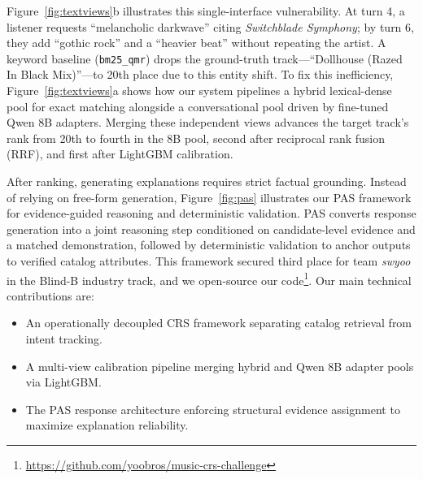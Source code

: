 Figure~\ref{fig:textviews}b illustrates this single-interface vulnerability. At turn 4, a listener requests ``melancholic darkwave'' citing \textit{Switchblade Symphony}; by turn 6, they add ``gothic rock'' and a ``heavier beat'' without repeating the artist. A keyword baseline (\texttt{bm25\_qmr}) drops the ground-truth track---``Dollhouse (Razed In Black Mix)''---to 20th place due to this entity shift. To fix this inefficiency, Figure~\ref{fig:textviews}a shows how our system pipelines a hybrid lexical-dense pool for exact matching alongside a conversational pool driven by fine-tuned Qwen 8B adapters. Merging these independent views advances the target track's rank from 20th to fourth in the 8B pool, second after reciprocal rank fusion (RRF), and first after LightGBM calibration.

After ranking, generating explanations requires strict factual grounding. Instead of relying on free-form generation, Figure~\ref{fig:pas} illustrates our PAS framework for evidence-guided reasoning and deterministic validation. PAS converts response generation into a joint reasoning step conditioned on candidate-level evidence and a matched demonstration, followed by deterministic validation to anchor outputs to verified catalog attributes. This framework secured third place for team \textit{swyoo} in the Blind-B industry track, and we open-source our code\footnote{\url{https://github.com/yoobros/music-crs-challenge}}. Our main technical contributions are:
\begin{itemize}
    \item An operationally decoupled CRS framework separating catalog retrieval from intent tracking.
    \item A multi-view calibration pipeline merging hybrid and Qwen 8B adapter pools via LightGBM.
    \item The PAS response architecture enforcing structural evidence assignment to maximize explanation reliability.
\end{itemize}

